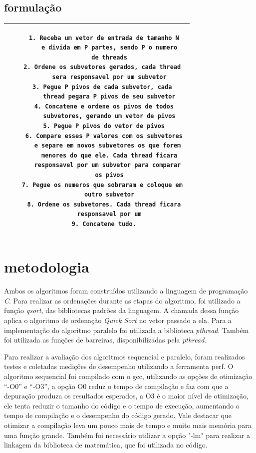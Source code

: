 \documentclass[journal]{IEEEtran}
\begin{document}
\subsection{formulação}\label{form_par}
\begin{table}[!htbp]
    \centering
    \begin{tabular}{|c|}\hline
         \begin{lstlisting} 
    1. Receba um vetor de entrada de tamanho N
       e divida em P partes, sendo P o numero
       de threads
    2. Ordene os subvetores gerados, cada thread 
       sera responsavel por um subvetor
    3. Pegue P pivos de cada subvetor, cada 
       thread pegara P pivos de seu subvetor
    4. Concatene e ordene os pivos de todos
       subvetores, gerando um vetor de pivos
    5. Pegue P pivos do vetor de pivos
    6. Compare esses P valores com os subvetores
       e separe em novos subvetores os que forem 
       menores do que ele. Cada thread ficara
       responsavel por um subvetor para comparar 
       os pivos
    7. Pegue os numeros que sobraram e coloque em 
       outro subvetor
    8. Ordene os subvetores. Cada thread ficara
       responsavel por um
    9. Concatene tudo.
\end{lstlisting} \\
         \hline
    \end{tabular}
    \label{tab:pseudo_par}
\end{table}
\section{metodologia}
Ambos os algoritmos foram construídos utilizando a linguagem de programação \textit{C}. Para realizar as ordenações durante as etapas do algoritmo, foi utilizado a função \textit{qsort}, das bibliotecas padrões da linguagem. A chamada dessa função aplica o algoritmo de ordenação \textit{Quick Sort} no vetor passado a ela. Para a implementação do algoritmo paralelo foi utilizada a biblioteca \textit{pthread}. Também foi utilizada as funções de barreiras, disponibilizadas pela \textit{pthread}.

Para realizar a avaliação dos algoritmos sequencial e paralelo, foram realizados testes e coletadas medições de desempenho utilizando a ferramenta perf. O algoritmo sequencial foi compilado com o gcc, utilizando as opções de otimização ``-O0'' e ``-O3'', a opção O0 reduz o tempo de compilação e faz com que a depuração produza os resultados esperados, a O3 é o maior nível de otimização, ele tenta reduzir o tamanho do código e o tempo de execução, aumentando o tempo de compilação e o desempenho do código gerado. Vale destacar que otimizar a compilação leva um pouco mais de tempo e muito mais memória para uma função grande. Também foi necessário utilizar a opção "-lm" para realizar a linkagem da biblioteca de matemática, que foi utilizada no código.
\end{document}
